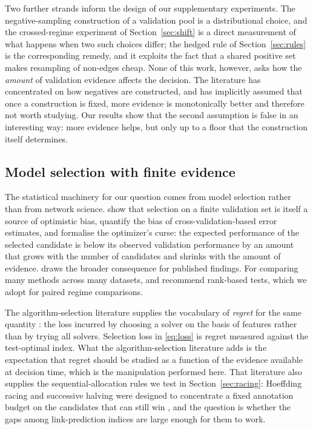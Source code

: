 \documentclass{comjnl}
\begin{document}
Two further strands inform the design of our supplementary experiments. The negative-sampling construction of a validation pool is a distributional choice, and the crossed-regime experiment of Section~\ref{sec:shift} is a direct measurement of what happens when two such choices differ; the hedged rule of Section~\ref{sec:rules} is the corresponding remedy, and it exploits the fact that a shared positive set makes resampling of non-edges cheap. None of this work, however, asks how the \emph{amount} of validation evidence affects the decision. The literature has concentrated on how negatives are constructed, and has implicitly assumed that once a construction is fixed, more evidence is monotonically better and therefore not worth studying. Our results show that the second assumption is false in an interesting way: more evidence helps, but only up to a floor that the construction itself determines.

\subsection{Model selection with finite evidence}

The statistical machinery for our question comes from model selection rather than from network science. \citet{cawley2010overfitting} show that selection on a finite validation set is itself a source of optimistic bias, \citet{varma2006bias} quantify the bias of cross-validation-based error estimates, and \citet{smith2006optimizer} formalise the optimizer's curse: the expected performance of the selected candidate is below its observed validation performance by an amount that grows with the number of candidates and shrinks with the amount of evidence. \citet{ioannidis2005why} draws the broader consequence for published findings. For comparing many methods across many datasets, \citet{demsar2006statistical} and \citet{dietterich1998approximate} recommend rank-based tests, which we adopt for paired regime comparisons.

The algorithm-selection literature supplies the vocabulary of \emph{regret} for the same quantity \citep{rice1976algorithm,kotthoff2014algorithm,brazdil2009metalearning}: the loss incurred by choosing a solver on the basis of features rather than by trying all solvers. Selection loss in \eqref{eq:loss} is regret measured against the test-optimal index. What the algorithm-selection literature adds is the expectation that regret should be studied as a function of the evidence available at decision time, which is the manipulation performed here. That literature also supplies the sequential-allocation rules we test in Section~\ref{sec:racing}: Hoeffding racing and successive halving were designed to concentrate a fixed annotation budget on the candidates that can still win \citep{maron1994hoeffding,karnin2013almost}, and the question is whether the gaps among link-prediction indices are large enough for them to work.
\end{document}
